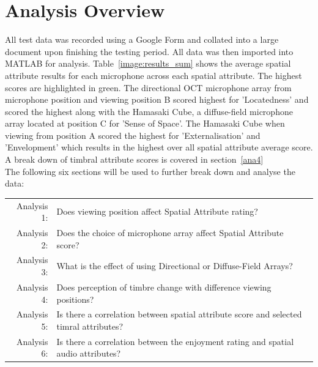 
















\section{Analysis Overview}

	All test data was recorded using a Google Form and collated into a large document upon finishing the testing period. All data was then imported into MATLAB for analysis. Table~\ref{image:results_sum} shows the average spatial attribute results for each microphone across each spatial attribute. The highest scores are highlighted in green. The directional OCT microphone array from microphone position and viewing position B scored highest for 'Locatedness' and scored the highest along with the Hamasaki Cube, a diffuse-field microphone array located at position C for 'Sense of Space'. The Hamasaki Cube when viewing from position A scored the highest for 'Externalisation' and 'Envelopment' which results in the highest over all spatial attribute average score. A break down of timbral attribute scores is covered in section~\ref{ana4}\\


	The following six sections will be used to further break down and analyse the data: \\

	\begin{tabular}{r p{5.5cm}}
		Analysis 1: & Does viewing position affect Spatial Attribute rating? \\
		Analysis 2: & Does the choice of microphone array affect Spatial Attribute score? \\
		Analysis 3: & What is the effect of using Directional or Diffuse-Field Arrays? \\ 
		Analysis 4: & Does perception of timbre change with difference viewing positions? \\
		Analysis 5: & Is there a correlation between spatial attribute score and selected timral attributes? \\
		Analysis 6: & Is there a correlation between the enjoyment rating and spatial audio attributes?
	\end{tabular}
	
